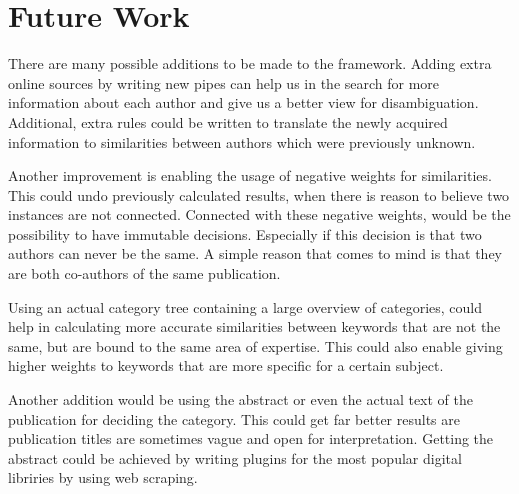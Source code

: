 \section{Future Work}

There are many possible additions to be made to the framework. Adding extra online sources by writing new pipes can help us in the search for more information about each author and give us a better view for disambiguation. Additional, extra rules could be written to translate the newly acquired information to similarities between authors which were previously unknown.

Another improvement is enabling the usage of negative weights for similarities. This could undo previously calculated results, when there is reason to believe two instances are not connected. Connected with these negative weights, would be the possibility to have immutable decisions. Especially if this decision is that two authors can never be the same. A simple reason that comes to mind is that they are both co-authors of the same publication.

Using an actual category tree containing a large overview of categories, could help in calculating more accurate similarities between keywords that are not the same, but are bound to the same area of expertise. This could also enable giving higher weights to keywords that are more specific for a certain subject.

Another addition would be using the abstract or even the actual text of the publication for deciding the category. This could get far better results are publication titles are sometimes vague and open for interpretation. Getting the abstract could be achieved by writing plugins for the most popular digital libriries by using web scraping.

% 